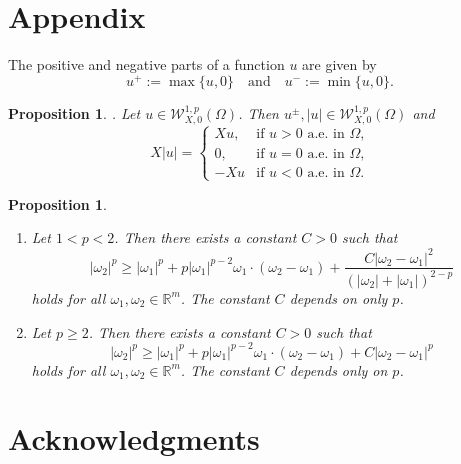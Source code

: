 \documentclass[a4paper,12pt,reqno]{amsart}
\numberwithin{equation}{section}
\theoremstyle{plain}
\newtheorem{proposition}[theorem]{Proposition}
\theoremstyle{definition}
\begin{document}
\section{Appendix}
The positive and negative parts of a function $u$ are given by
$$u^{+}:=\max \{u, 0\}\quad\text{and}\quad u^{-}:=\min \{u, 0\}.$$
\begin{proposition}\label{proposition Xu} \cite[Lemma 3.5]{garofalo1996isoperimetric}. 
Let $u \in \mathcal{W}_{X,0}^{1, p}(\Omega)$. Then  $u^{\pm},|u| \in \mathcal{W}_{X,0}^{1, p}(\Omega)$ and 
\begin{equation*}
X|u|=\begin{cases}
Xu, & \text{if $u>0$ a.e.  in $\Omega$,}\\
0, & \text{if $u= 0$ a.e.  in $\Omega$,}\\
-Xu & \text{if $u<0$ a.e.  in $\Omega$.}
\end{cases}
\end{equation*}
\end{proposition}

\begin{proposition}\label{convexity inequality}\cite[Lemma 4.2]{Lin1990}
\begin{enumerate}[label=(\roman*)]
\item  Let $1<p<2$. Then there exists a constant $C>0$ such that
\begin{equation}\label{convexity (b)}
|\omega_{2}|^{p} \geq|\omega_{1}|^{p}+p|\omega_{1}|^{p-2} \omega_{1} \cdot(\omega_{2}-\omega_{1})+ \frac{C|\omega_{2}-\omega_{1}|^{2}}{(|\omega_{2}|+|\omega_{1}|)^{2-p}} 
\end{equation}
holds  for all $\omega_{1}, \omega_{2} \in \mathbb{R}^{m}$. The constant $C$ depends on only $p$.

\item  Let $p \geq 2$. Then there exists a constant $C>0$ such that
\begin{equation}\label{convexity (a)}
|\omega_{2}|^{p} \geq|\omega_{1}|^{p}+p|\omega_{1}|^{p-2} \omega_{1} \cdot(\omega_{2}-\omega_{1})+C|\omega_{2}-\omega_{1}|^{p}
\end{equation}
holds for all $\omega_{1}, \omega_{2} \in \mathbb{R}^{m}$. The constant $C$ depends only on $p$.
\end{enumerate}
\end{proposition}

\section{Acknowledgments}
\end{document}

